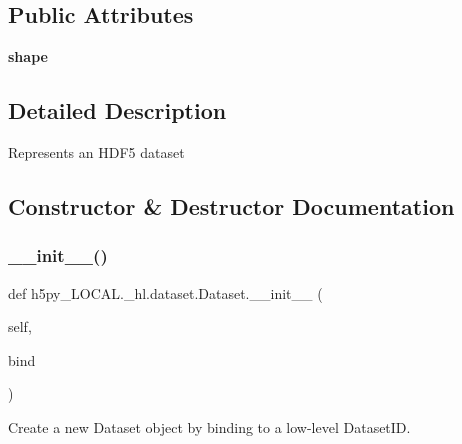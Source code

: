 \subsection*{Public Attributes}
\begin{DoxyCompactItemize}
\item 
\mbox{\label{classh5py__LOCAL_1_1__hl_1_1dataset_1_1Dataset_a609f6901d4ebb2905502341769bf82d4}} 
{\bfseries shape}
\end{DoxyCompactItemize}


\subsection{Detailed Description}
\begin{DoxyVerb}    Represents an HDF5 dataset
\end{DoxyVerb}
 

\subsection{Constructor \& Destructor Documentation}
\mbox{\label{classh5py__LOCAL_1_1__hl_1_1dataset_1_1Dataset_a05ccdf7e6ce8d01f08da87bf3b409ad9}} 
\subsubsection{\texorpdfstring{\+\_\+\+\_\+init\+\_\+\+\_\+()}{\_\_init\_\_()}}
{\footnotesize\ttfamily def h5py\+\_\+\+L\+O\+C\+A\+L.\+\_\+hl.\+dataset.\+Dataset.\+\_\+\+\_\+init\+\_\+\+\_\+ (\begin{DoxyParamCaption}\item[{}]{self,  }\item[{}]{bind }\end{DoxyParamCaption})}

\begin{DoxyVerb}Create a new Dataset object by binding to a low-level DatasetID.
\end{DoxyVerb}
 

